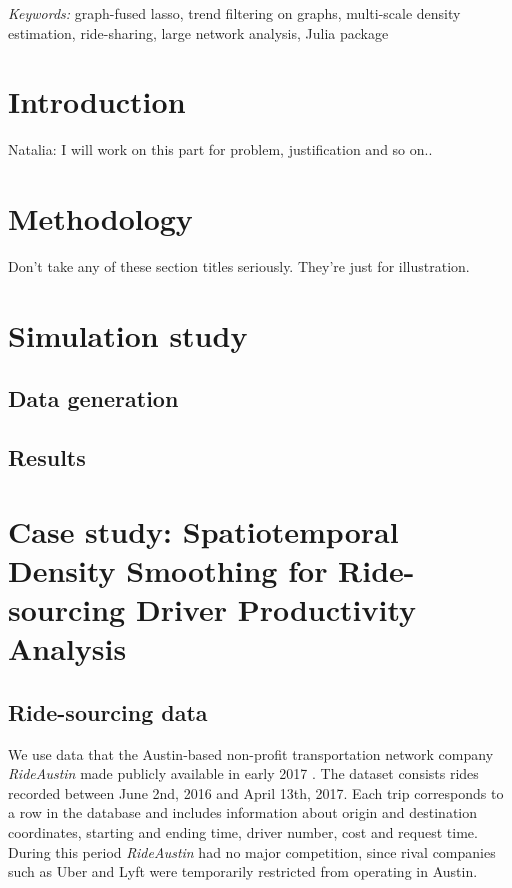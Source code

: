 \documentclass[11pt]{article}
\def\spacingset#1{\renewcommand{\baselinestretch}%
{#1}\small\normalsize} \spacingset{1}
\begin{document}
\noindent%
{\it Keywords:}  graph-fused lasso, trend filtering on graphs, multi-scale density estimation, ride-sharing, large network analysis, Julia package
\vfill

\newpage
\spacingset{1.5} %

\section{Introduction}
\label{sec:intro}

Natalia: I will work on this part for problem, justification and so on.. 

\section{Methodology}
\label{sec:meth}
Don't take any of these section titles seriously.  They're just for
illustration.

\section{Simulation study}
\subsection{Data generation}
\subsection{Results}

\section{Case study: Spatiotemporal Density Smoothing for Ride-sourcing Driver Productivity Analysis}
\label{sec:casestudy}


\subsection{Ride-sourcing data}

We use data that the Austin-based non-profit transportation network company \textit{RideAustin} made publicly available in early 2017 \citep{dataworld-2017}. The dataset consists rides recorded between June 2nd, 2016 and April 13th, 2017. Each trip corresponds to a row in the database and includes information about origin and destination coordinates, starting and ending time, driver number, cost and request time. During this period \textit{RideAustin} had no major competition, since rival companies such as Uber and Lyft were temporarily restricted from operating in Austin.
\end{document}
